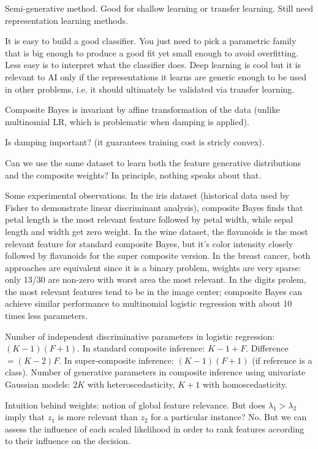 \documentclass[english]{scrartcl}
\begin{document}
{\color{red} Semi-generative method. Good for shallow learning or transfer learning. Still need representation learning methods.}

{\color{red} It is easy to build a good classifier. You just need to pick a parametric family that is big enough to produce a good fit yet small enough to avoid overfitting. Less easy is to interpret what the classifier does. Deep learning is cool but it is relevant to AI only if the representations it learns are generic enough to be used in other problems, i.e. it should ultimately be validated via transfer learning.}

{\color{red} Composite Bayes is invariant by affine transformation of the data (unlike multinomial LR, which is problematic when damping is applied).}

{\color{red} Is damping important? (it guarantees training cost is stricly convex).}

{\color{red} Can we use the same dataset to learn both the feature generative distributions and the composite weights? In principle, nothing speaks about that.} 


Some experimental observations. In the iris dataset (historical data used by Fisher to demonstrate linear discriminant analysis), composite Bayes finds that petal length is the most relevant feature followed by petal width, while sepal length and width get zero weight. In the wine dataset, the flavanoids is the most relevant feature for standard composite Bayes, but it's color intensity closely followed by flavanoids for the super composite version. In the breast cancer, both approaches are equivalent since it is a binary problem, weights are very sparse: only 13/30 are non-zero with worst area the most relevant. In the digits prolem, the most relevant features tend to be in the image center; composite Bayes can achieve similar performance to multinomial logistic regression with about 10 times less parameters.

Number of independent discriminative parameters in logistic regression: $(K-1)(F+1)$. In standard composite inference: $K-1+F$. Difference $=(K-2)F$. In super-composite inference: $(K-1)(F+1)$ (if reference is a class). Number of generative parameters in composite inference using univariate Gaussian models: $2K$ with heteroscedasticity, $K+1$ with homoscedasticity. 

Intuition behind weights: notion of global feature relevance. But does $\lambda_1>\lambda_2$ imply that $z_1$ is more relevant than $z_2$ for a particular instance? No. But we can assess the influence of each scaled likelihood in order to rank features according to their influence on the decision.
\end{document}
